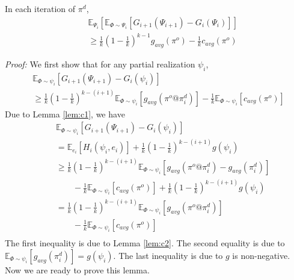 \documentclass[twoside,leqno,twocolumn]{article}
\begin{document}
\begin{lemma}
\label{lem:c3}
In each iteration of $\pi^d$,
\begin{eqnarray*}
&&\mathbb{E}_{\Psi_i}[\mathbb{E}_{\Phi\sim \Psi_i}[G_{i+1}(\Psi_{i+1})- G_{i}(\Psi_i)]] \\
&&\geq \frac{1}{k}(1-\frac{1}{k})^{k-1}g_{avg}(\pi^o) -\frac{1}{k}c_{avg}(\pi^o)
\end{eqnarray*}
\end{lemma}
\emph{Proof:} We first show that for any partial realization $\psi_i$,
\begin{eqnarray}
&\mathbb{E}_{\Phi\sim \psi_i}[G_{i+1}(\Psi_{i+1})- G_{i}(\psi_i)] \label{eq:c1}\\
& \geq \frac{1}{k}(1-\frac{1}{k})^{k-(i+1)} \mathbb{E}_{\Phi\sim \psi_i}[g_{avg}(\pi^o@\pi^d_i)]-\frac{1}{k}\mathbb{E}_{\Phi\sim \psi_i}[c_{avg}(\pi^o)]~\nonumber
\end{eqnarray}
Due to Lemma \ref{lem:c1}, we have
\begin{eqnarray*}
&&\mathbb{E}_{\Phi\sim \psi_i}[G_{i+1}(\Psi_{i+1})- G_{i}(\psi_i)] \\
&& = \mathbb{E}_{e_i}[H_i(\psi_i, e_i)]+\frac{1}{k}(1-\frac{1}{k})^{k-(i+1)} g(\psi_i)\\
&& \geq \frac{1}{k}(1-\frac{1}{k})^{k-(i+1)}\mathbb{E}_{\Phi\sim \psi_i}[g_{avg}(\pi^o@\pi^d_i)-g_{avg}(\pi^d_i)]\\
&& \quad\quad-\frac{1}{k}\mathbb{E}_{\Phi\sim \psi_i}[c_{avg}(\pi^o)]+\frac{1}{k}(1-\frac{1}{k})^{k-(i+1)} g(\psi_i)\\
&& = \frac{1}{k}(1-\frac{1}{k})^{k-(i+1)} \mathbb{E}_{\Phi\sim \psi_i}[g_{avg}(\pi^o@\pi^d_i)]\\
&& \quad\quad -\frac{1}{k}\mathbb{E}_{\Phi\sim \psi_i}[c_{avg}(\pi^o)] \\
\end{eqnarray*}
The first inequality is due to Lemma \ref{lem:c2}. The second equality is due to $\mathbb{E}_{\Phi\sim \psi_i}[g_{avg}(\pi^d_i)] =  g(\psi_i)$. The last inequality is due to $g$ is non-negative. Now we are ready to prove this lemma.
\end{document}
